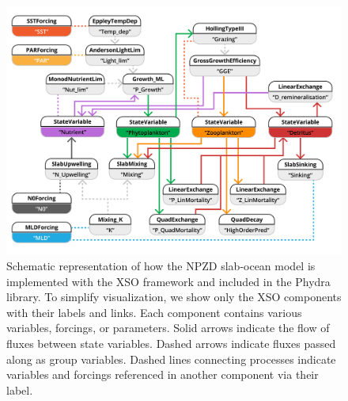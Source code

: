 \documentclass[gmd, manuscript]{copernicus}
\begin{document}
\begin{figure}[t]
\includegraphics[width=15cm]{Figures/firstdraft_schematics/code_schematics/EMPOWER.pdf}
\caption{Schematic representation of how the NPZD slab-ocean model is implemented with the XSO framework and included in the Phydra library. To simplify visualization, we show only the XSO components with their labels and links. Each component contains various variables, forcings, or parameters. Solid arrows indicate the flow of fluxes between state variables. Dashed arrows indicate fluxes passed along as group variables. Dashed lines connecting processes indicate variables and forcings referenced in another component via their label.}
\label{Figure:CodeSchematics_2}
\end{figure}
\end{document}
